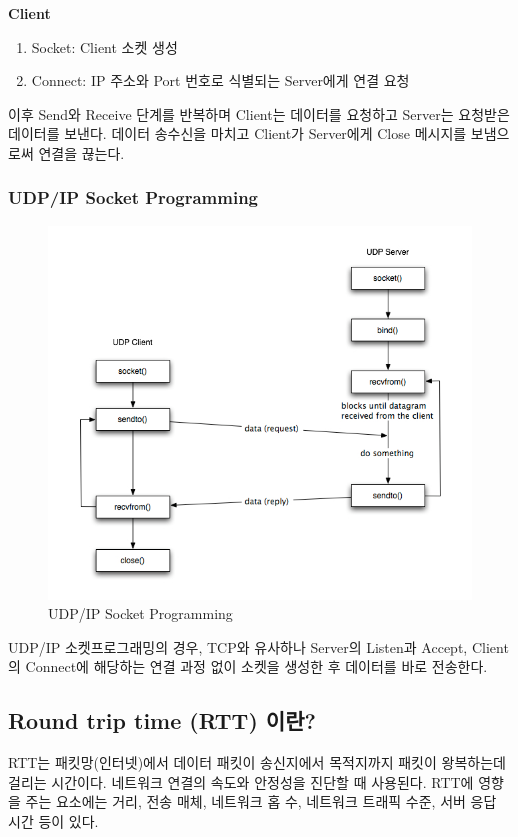     \textbf{Client}
    \begin{enumerate}
        \item Socket: Client 소켓 생성
        \item Connect: IP 주소와 Port 번호로 식별되는 Server에게 연결 요청
    \end{enumerate}
    이후 Send와 Receive 단계를 반복하며 Client는 데이터를 요청하고 Server는 요청받은 데이터를 보낸다. 데이터 송수신을 마치고 Client가 Server에게 Close 메시지를 보냄으로써 연결을 끊는다. \\
    
\newpage  
    \subsubsection*{UDP/IP Socket Programming}
    \vspace{-4mm}
    \begin{figure}[!h]\centering
		\includegraphics[width=.65\textwidth]{image/week07/1-4.png}
		\caption{\small UDP/IP Socket Programming}
		\vspace{-10pt}
    \end{figure}
    UDP/IP 소켓프로그래밍의 경우, TCP와 유사하나 Server의 Listen과 Accept, Client의 Connect에 해당하는 연결 과정 없이 소켓을 생성한 후 데이터를 바로 전송한다. \\
    
\subsection{Round trip time (RTT) 이란?}    
    RTT는 패킷망(인터넷)에서 데이터 패킷이 송신지에서 목적지까지 패킷이 왕복하는데 걸리는 시간이다. 네트워크 연결의 속도와 안정성을 진단할 때 사용된다. RTT에 영향을 주는 요소에는 거리, 전송 매체, 네트워크 홉 수, 네트워크 트래픽 수준, 서버 응답 시간 등이 있다. \\
\newpage